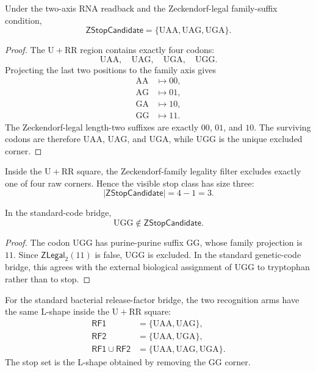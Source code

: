 \begin{theorem}
\label{thm:philosophy-three-stop-reconstruction}
Under the two-axis RNA readback and the Zeckendorf-legal family-suffix
condition,
$$
  \mathsf{ZStopCandidate}
  =
  \{\mathrm{UAA},\mathrm{UAG},\mathrm{UGA}\}.
$$
\end{theorem}
\begin{proof}
The $\mathrm{U}+\mathrm{RR}$ region contains exactly four codons:
$$
  \mathrm{UAA},\quad \mathrm{UAG},\quad
  \mathrm{UGA},\quad \mathrm{UGG}.
$$
Projecting the last two positions to the family axis gives
$$
\begin{aligned}
  \mathrm{AA} &\longmapsto 00,\\
  \mathrm{AG} &\longmapsto 01,\\
  \mathrm{GA} &\longmapsto 10,\\
  \mathrm{GG} &\longmapsto 11.
\end{aligned}
$$
The Zeckendorf-legal length-two suffixes are exactly $00$, $01$, and
$10$. The surviving codons are therefore $\mathrm{UAA}$,
$\mathrm{UAG}$, and $\mathrm{UGA}$, while $\mathrm{UGG}$ is the unique
excluded corner.
\end{proof}

\begin{corollary}
\label{cor:philosophy-stop-three-not-four}
Inside the $\mathrm{U}+\mathrm{RR}$ square, the Zeckendorf-family
legality filter excludes exactly one of four raw corners. Hence the
visible stop class has size three:
$$
  |\mathsf{ZStopCandidate}|=4-1=3.
$$
\end{corollary}

\begin{corollary}
\label{cor:philosophy-ugg-excluded-corner}
In the standard-code bridge,
$$
  \mathrm{UGG}\notin\mathsf{ZStopCandidate}.
$$
\end{corollary}
\begin{proof}
The codon $\mathrm{UGG}$ has purine-purine suffix $\mathrm{GG}$, whose
family projection is $11$. Since $\mathsf{ZLegal}_{2}(11)$ is false,
$\mathrm{UGG}$ is excluded. In the standard genetic-code bridge, this
agrees with the external biological assignment of $\mathrm{UGG}$ to
tryptophan rather than to stop.
\end{proof}

\begin{corollary}
\label{cor:philosophy-release-factor-l-shape}
For the standard bacterial release-factor bridge, the two recognition
arms have the same L-shape inside the $\mathrm{U}+\mathrm{RR}$ square:
$$
\begin{aligned}
  \mathsf{RF1} &= \{\mathrm{UAA},\mathrm{UAG}\},\\
  \mathsf{RF2} &= \{\mathrm{UAA},\mathrm{UGA}\},\\
  \mathsf{RF1}\cup\mathsf{RF2}
    &= \{\mathrm{UAA},\mathrm{UAG},\mathrm{UGA}\}.
\end{aligned}
$$
The stop set is the L-shape obtained by removing the $\mathrm{GG}$
corner.
\end{corollary}


